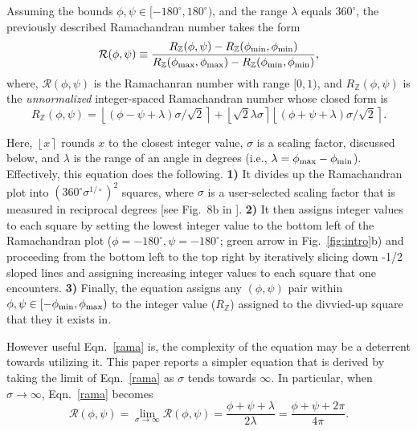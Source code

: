 \documentclass[fleqn,10pt,lineno]{wlpeerj} %
\newcommand{\round}[1]{\left \lfloor #1 \right \rceil }
\newcommand{\Fig}[1]{Fig.~\ref{#1}}
\newcommand{\Eqn}[1]{Eqn.~\ref{#1}}
\begin{document}
Assuming the bounds $\phi,\psi \in [-180^\circ,180^\circ)$, and the range $\lambda$ equals $360^\circ$, the previously described Ramachandran number takes the form 
\begin{equation}
{\mathcal{R}}(\phi,\psi) \equiv  \frac{R_\mathbb{Z}(\phi,\psi)-R_{\mathbb{Z}}(\phi_{\rm{min}},\phi_{\rm{min}})}
{R_{\mathbb{Z}}(\phi_{\rm{max}},\phi_{\rm{max}})-R_{\mathbb{Z}}(\phi_{\rm{min}},\phi_{\rm{min}})},\label{rama}
\end{equation}
where, $\mathcal{R}(\phi,\psi)$ is the Ramachanran number with range $[0,1)$, and $R_\mathbb{Z}(\phi,\psi)$ is the {\it unnormalized} integer-spaced Ramachandran number whose closed form is
\begin{equation}
R_\mathbb{Z}(\phi,\psi)  = \round{(\phi - \psi + \lambda)\sigma/\sqrt{2}}  + \round{\sqrt{2} \lambda\sigma} \round{(\phi+\psi + \lambda)\sigma/\sqrt{2}}.\label{ramachandran_raw}
\end{equation}

Here, $\round{x}$ rounds $x$ to the closest integer value, $\sigma$ is a scaling factor, discussed below, and $\lambda$ is the range of an angle in degrees (i.e., $\lambda=\phi_{\rm max}-\phi_{\rm min}$). Effectively, this equation does the following. \textbf{1)} It divides up the Ramachandran plot into $(360^\circ \sigma^{1/\circ})^2$  squares, where $\sigma$ is a user-selected scaling factor that is measured in reciprocal degrees [see Fig.~8b in \cite{Mannige2016}]. \textbf{2)} It then assigns integer values to each square by setting the lowest integer value to the bottom left of the Ramachandran plot ($\phi=-180^\circ,\psi=-180^\circ$; green arrow in \Fig{fig:intro}b) and proceeding from the bottom left to the top right by iteratively slicing down -1/2 sloped lines and assigning increasing integer values to each square that one encounters. \textbf{3)} Finally, the equation assigns any $(\phi,\psi)$ pair within $\phi,\psi \in [-\phi_{\rm min},\phi_{\rm max})$ to the integer value ($R_\mathbb{Z}$) assigned to the divvied-up square that they it exists in. 

However useful \Eqn{rama} is, the complexity of the equation may be a deterrent towards utilizing it. This paper reports a simpler equation that is derived by taking the limit of \Eqn{rama} as $\sigma$ tends towards $\infty$. In particular, when $\sigma\to\infty$, \Eqn{rama} becomes
\begin{equation}
\mathcal{R}(\phi,\psi) = \lim_{\sigma\to\infty}{\mathcal{R}}(\phi,\psi) = \frac{\phi+\psi+\lambda}{2\lambda} =
\frac{\phi+\psi+2\pi}{4\pi}.
\label{rama2}
\end{equation}
\end{document}
